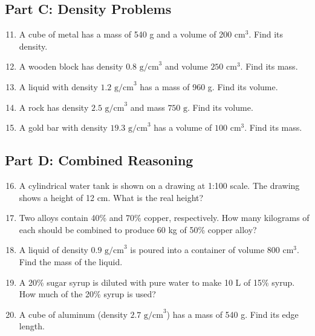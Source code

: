 \documentclass[12pt]{article}
\begin{document}
\subsection*{Part C: Density Problems}
\begin{enumerate}
  \setcounter{enumi}{10}
  \item A cube of metal has a mass of 540 g and a volume of 200 cm\(^3\). Find its density.
  \item A wooden block has density \(0.8\text{ g/cm}^3\) and volume \(250\text{ cm}^3\). Find its mass.
  \item A liquid with density \(1.2\text{ g/cm}^3\) has a mass of 960 g. Find its volume.
  \item A rock has density \(2.5\text{ g/cm}^3\) and mass \(750\text{ g}\). Find its volume.
  \item A gold bar with density \(19.3\text{ g/cm}^3\) has a volume of \(100\text{ cm}^3\). Find its mass.
\end{enumerate}

\subsection*{Part D: Combined Reasoning}
\begin{enumerate}
  \setcounter{enumi}{15}
  \item A cylindrical water tank is shown on a drawing at 1:100 scale. The drawing shows a height of 12 cm. What is the real height?
  \item Two alloys contain 40\% and 70\% copper, respectively. How many kilograms of each should be combined to produce 60 kg of 50\% copper alloy?
  \item A liquid of density \(0.9\text{ g/cm}^3\) is poured into a container of volume 800 cm\(^3\). Find the mass of the liquid.
  \item A 20\% sugar syrup is diluted with pure water to make 10 L of 15\% syrup. How much of the 20\% syrup is used?
  \item A cube of aluminum (density \(2.7\text{ g/cm}^3\)) has a mass of 540 g. Find its edge length.
\end{enumerate}
\end{document}

